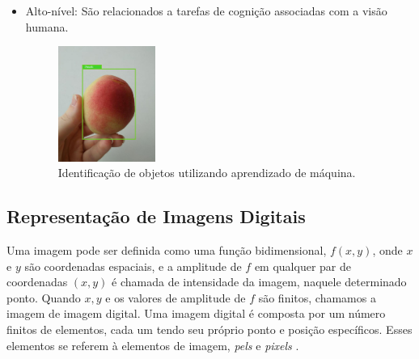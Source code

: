 \begin{itemize}
\item Alto-nível:
São relacionados a tarefas de cognição associadas com a visão humana.
       \begin{figure}[h]
	\caption{\label{fig:machineflow}Identificação de objetos utilizando aprendizado de máquina.}
	\begin{center}
	    \includegraphics[width=0.3\textwidth]{peachs/tensorflow}
	\end{center}
\end{figure}
	
\end{itemize} 

\subsection{Representação de Imagens Digitais}
Uma imagem pode ser definida como uma função bidimensional, $f(x,y)$, onde $x$ e $y$ são coordenadas espaciais, e a amplitude de $f$ em qualquer par de coordenadas $(x,y)$ é chamada de intensidade da imagem, naquele determinado ponto. Quando $x,y$ e os valores de amplitude de $f$ são finitos, chamamos a imagem de imagem digital. Uma imagem digital é composta por um número finitos de elementos, cada um tendo seu próprio ponto e posição específicos. Esses elementos se referem à elementos de imagem, \textit{pels} e \textit{pixels} \cite{gonzalez1992digital}. 

